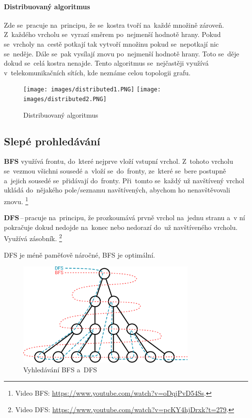 \paragraph{Distribuovaný algoritmus} Zde se~pracuje na~principu, že se~kostra tvoří na~každé množině zároveň. Z~každého vrcholu se~vyrazí směrem po~nejmenší hodnotě hrany. Pokud se~vrcholy na~cestě potkají tak vytvoří množinu pokud se~nepotkají nic se~neděje. Dále se~pak vysílají znovu po~nejmenší hodnotě hrany. Toto se~děje dokud se~celá kostra nenajde. Tento algoritmus se~nejčastěji využívá v~telekomunikačních sítích, kde neznáme celou topologii grafu.

\begin{figure}[ht]
	\centering
	\texttt{[image: images/distributed1.PNG]}
	\texttt{[image: images/distributed2.PNG]}
	\caption{Distribuovaný algoritmus}
	\label{distributed}
\end{figure}

\subsection{Slepé prohledávání}

\textbf{BFS} využívá frontu, do~které nejprve vloží vstupní vrchol. Z~tohoto vrcholu se~vezmou všichni sousedé a~vloží se~do~fronty, ze~které se~bere postupně a~jejich sousedé se~přidávají do~fronty. Při~tomto se~každý už navštívený vrchol ukládá do~nějakého pole/seznamu navštívených, abychom ho nenavštěvovali znovu.%
\footnote{Video BFS: \url{https://www.youtube.com/watch?v=oDqjPvD54Ss}.}

\textbf{DFS}\,--\,pracuje na~principu, že prozkoumává prvně vrchol na~jednu stranu a~v ní pokračuje dokud nedojde na~konec nebo nedorazí do~už navštíveného vrcholu. Využívá zásobník.%
\footnote{Video DFS: \url{https://www.youtube.com/watch?v=pcKY4hjDrxk?t=279}.}

DFS je méně paměťově náročné, BFS je optimální.

\begin{figure}[ht]
	\centering
	\includegraphics[width=0.8\textwidth]{images/bfs-dfs.png}
	\caption{Vyhledávání BFS a~DFS}
\end{figure}

